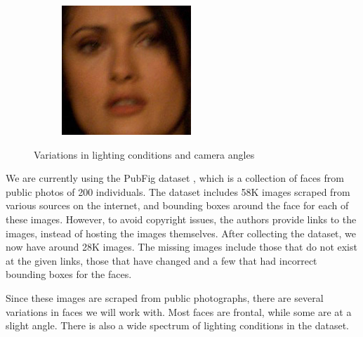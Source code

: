 \documentclass[twocolumn]{article}
\begin{document}
\begin{figure}[h]
\begin{subfigure}[b]{0.3\linewidth}
        \label{fig:nicole}
    \end{subfigure}
    \hfill
    \begin{subfigure}[b]{0.3\linewidth}
        \includegraphics[width=\linewidth]{images/dataset/Salma_Hayek_184}
        \label{fig:morgan}
    \end{subfigure}
    \caption{Variations in lighting conditions and camera angles}\label{fig:dataset}
\end{figure}
We are currently using the PubFig dataset \cite{dataset}, which is a collection of faces from public photos of 200 individuals. The dataset includes 58K images scraped from various sources on the internet, and bounding boxes around the face for each of these images. However, to avoid copyright issues, the authors provide links to the images, instead of hosting the images themselves. After collecting the dataset, we now have around 28K images. The missing images include those that do not exist at the given links, those that have changed and a few that had incorrect bounding boxes for the faces.

Since these images are scraped from public photographs, there are several variations in faces we will work with. Most faces are frontal, while some are at a slight angle. There is also a wide spectrum of lighting conditions in the dataset. 
\end{document}
